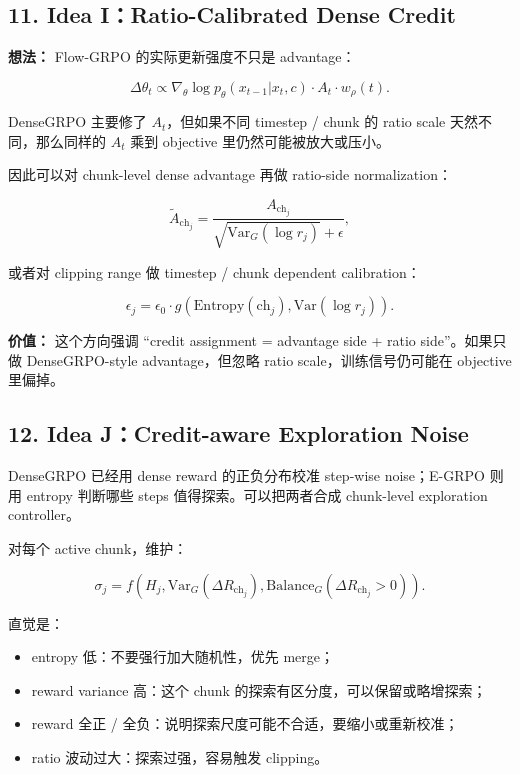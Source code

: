 \subsection{11. Idea I：Ratio-Calibrated Dense Credit}

\textbf{想法：} Flow-GRPO 的实际更新强度不只是 advantage：

\[
\Delta \theta_t
\propto
\nabla_{\theta}\log p_{\theta}(x_{t-1}|x_t,c)
\cdot A_t
\cdot w_{\rho}(t).
\]

DenseGRPO 主要修了 \(A_t\)，但如果不同 timestep / chunk 的 ratio scale 天然不同，那么同样的 \(A_t\) 乘到 objective 里仍然可能被放大或压小。

因此可以对 chunk-level dense advantage 再做 ratio-side normalization：

\[
\tilde{A}_{\mathrm{ch}_j}
=
\frac{A_{\mathrm{ch}_j}}{\sqrt{\mathrm{Var}_{G}(\log r_j)}+\epsilon},
\]

或者对 clipping range 做 timestep / chunk dependent calibration：

\[
\epsilon_j
=\epsilon_0\cdot g\left(\mathrm{Entropy}(\mathrm{ch}_j),\mathrm{Var}(\log r_j)\right).
\]

\begin{summarybox}
\textbf{价值：} 这个方向强调 ``credit assignment = advantage side + ratio side''。如果只做 DenseGRPO-style advantage，但忽略 ratio scale，训练信号仍可能在 objective 里偏掉。
\end{summarybox}

\subsection{12. Idea J：Credit-aware Exploration Noise}

DenseGRPO 已经用 dense reward 的正负分布校准 step-wise noise；E-GRPO 则用 entropy 判断哪些 steps 值得探索。可以把两者合成 chunk-level exploration controller。

对每个 active chunk，维护：

\[
\sigma_j
=f\left(
H_j,
\mathrm{Var}_{G}(\Delta R_{\mathrm{ch}_j}),
\mathrm{Balance}_{G}(\Delta R_{\mathrm{ch}_j}>0)
\right).
\]

直觉是：

\begin{itemize}[leftmargin=1.5em]
  \item entropy 低：不要强行加大随机性，优先 merge；
  \item reward variance 高：这个 chunk 的探索有区分度，可以保留或略增探索；
  \item reward 全正 / 全负：说明探索尺度可能不合适，要缩小或重新校准；
  \item ratio 波动过大：探索过强，容易触发 clipping。
\end{itemize}


